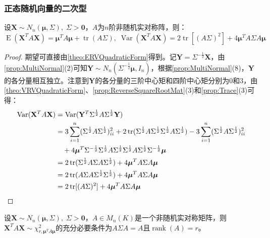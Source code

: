 \subsubsection{正态随机向量的二次型}
\begin{theorem}
	设$\mathbf{X}\sim N_n(\boldsymbol{\mu},\Sigma),\;\Sigma>\mathbf{0}$，$A$为$n$阶非随机实对称阵，则：
	\begin{equation*}
		\operatorname{E}(\mathbf{X}^TA\mathbf{X})=\boldsymbol{\mu}^TA\boldsymbol{\mu}+\operatorname{tr}(A\Sigma),\;
		\operatorname{Var}(\mathbf{X}^TA\mathbf{X})=2\operatorname{tr}[(A\Sigma)^2]+4\boldsymbol{\mu}^TA\Sigma A\boldsymbol{\mu}
	\end{equation*}
\end{theorem}
\begin{proof}
	期望可直接由\cref{theo:ERVQuadraticForm}得到。记$\mathbf{Y}=\Sigma^{-\frac{1}{2}}\mathbf{X}$，由\cref{prop:MultiNormal}(2)可知$\mathbf{Y}\sim N_n(\Sigma^{-\frac{1}{2}}\boldsymbol{\mu},I_n)$，根据\cref{prop:MultiNormal}(8)，$\mathbf{Y}$的各分量相互独立。注意到$\mathbf{Y}$的各分量的三阶中心矩和四阶中心矩分别为$0$和$3$，由\cref{theo:VRVQuadraticForm}、\cref{prop:ReverseSquareRootMat}(3)和\cref{prop:Trace}(3)可得：
	\begin{align*}
		\operatorname{Var}(\mathbf{X}^TA\mathbf{X})
		&=\operatorname{Var}(\mathbf{Y}^T\Sigma^{\frac{1}{2}}A\Sigma^{\frac{1}{2}}\mathbf{Y}) \\
		&=3\sum_{i=1}^{n}(\Sigma^{\frac{1}{2}}A\Sigma^{\frac{1}{2}})_{ii}^2+2\operatorname{tr}(\Sigma^{\frac{1}{2}}A\Sigma^{\frac{1}{2}}\Sigma^{\frac{1}{2}}A\Sigma^{\frac{1}{2}})-3\sum_{i=1}^{n}(\Sigma^{\frac{1}{2}}A\Sigma^{\frac{1}{2}})_{ii}^2 \\
		&\quad+4\boldsymbol{\mu}^T\Sigma^{-\frac{1}{2}}\Sigma^{\frac{1}{2}}A\Sigma^{\frac{1}{2}}\Sigma^{\frac{1}{2}}A\Sigma^{\frac{1}{2}}\Sigma^{-\frac{1}{2}}\boldsymbol{\mu} \\
		&=2\operatorname{tr}(\Sigma^{\frac{1}{2}}A\Sigma A\Sigma^{\frac{1}{2}})+4\boldsymbol{\mu}^TA\Sigma A\boldsymbol{\mu} \\
		&=2\operatorname{tr}(A\Sigma A\Sigma^{\frac{1}{2}}\Sigma^{\frac{1}{2}})+4\boldsymbol{\mu}^TA\Sigma A\boldsymbol{\mu} \\
		&=2\operatorname{tr}[(A\Sigma)^2]+4\boldsymbol{\mu}^TA\Sigma A\boldsymbol{\mu}\qedhere
	\end{align*}
\end{proof}
\begin{theorem}\label{theo:XAXChi2}
	设$\mathbf{X}\sim N_n(\boldsymbol{\mu},\Sigma),\;\Sigma>\mathbf{0}$，$A\in M_{n}(K)$是一个非随机实对称矩阵，则$\mathbf{X}^TA\mathbf{X}\sim\chi_{r,\boldsymbol{\mu}^TA\boldsymbol{\mu}}^2$的充分必要条件为$A\Sigma A=A$且$\operatorname{rank}(A)=r$。
\end{theorem}
